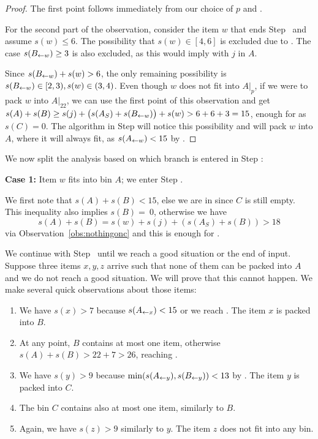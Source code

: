 \begin{proof}
The first point follows immediately from our choice of $p$ and .

For the second part of the observation, consider the item $w$ that
ends Step~ and assume $s(w) \le 6$. The possibility that
$s(w) \in  [4,6]$ is excluded due to . The case $s(B_{\leftarrow w}) \ge  3$ is
also excluded, as this would imply  with $j$ in $A$.

Since $s(B_{\leftarrow w}) + s(w) > 6$, the only remaining possibility is $s(B_{\leftarrow w}) \in  [2,3), s(w) \in 
(3,4)$. Even though $w$ does not fit into $A|_p$, if we were to pack
$w$ into $A|_{22}$, we can use the first point of this observation and get
$s(A) + s(B) \ge  s(j) + \big(s(A_S) + s(B_{\leftarrow w})\big) + s(w) > 6 + 6 + 3 = 15$, enough for  as $s(C) = 0$. The algorithm
 in Step  will notice this
possibility and will pack $w$ into $A$, where it will always fit, as
$s(A_{\leftarrow w}) < 15$ by .
\end{proof}

We now split the analysis based on which branch is entered in Step :

\smallskip
\noindent
{\bf Case 1:} Item $w$ fits into bin $A$; we enter Step .

We first note that $s(A)+s(B)<15$, else we are in  since $C$ is still empty. This inequality also
implies $s(B) =~0$, otherwise we have
\[s(A) + s(B) = s(w) + s(j) + (s(A_S) +s(B)) > 18\]
via Observation~\ref{obs:nothingonc} and this is enough for .

We continue with Step~ until we reach a good situation or
the end of input.  Suppose three items $x,y,z$ arrive such that none of them 
can be packed into $A$ and we do not reach a good situation. We will prove that
this cannot happen. We make several quick observations about those items:

\begin{enumerate}
\item We have $s(x) > 7$ because $s(A_{\leftarrow x}) < 15$ or we reach . The item $x$ is packed into $B$.
\item At any point, $B$ contains at most one item, otherwise $s(A) + s(B) > 22 + 7 > 26$, reaching .
\item We have $s(y) > 9$ because $\min(s(A_{\leftarrow y}), s(B_{\leftarrow y})) < 13$ by . The item $y$ is packed into $C$.
\item The bin $C$ contains also at most one item, similarly to $B$.
\item Again, we have $s(z) > 9$ similarly to $y$. The item $z$ does not fit into any bin.
\end{enumerate}

